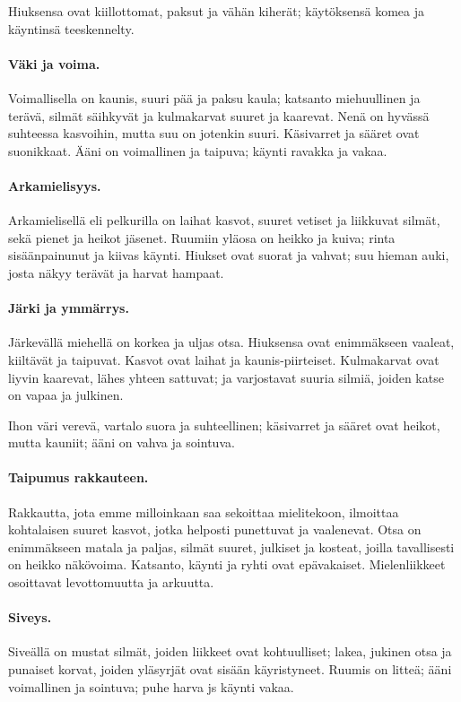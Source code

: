\documentclass[11pt, twoside, finnish, a5paper]{book}
\begin{document}
Hiuksensa ovat kiillottomat, paksut ja vähän kiherät;
käytöksensä komea ja käyntinsä teeskennelty.

\paragraph{Väki ja voima.}
Voimallisella on kaunis, suuri pää ja paksu kaula;
katsanto miehuullinen ja terävä, silmät säihkyvät 
ja kulmakarvat suuret ja kaarevat.
 Nenä on hyvässä suhteessa kasvoihin, mutta suu
on jotenkin suuri. Käsivarret ja sääret ovat
suonikkaat. Ääni on voimallinen ja taipuva;
käynti ravakka ja vakaa.


\paragraph{Arkamielisyys.}
Arkamielisellä eli pelkurilla on laihat kasvot, suuret
vetiset ja liikkuvat silmät, sekä pienet ja heikot jäsenet.
Ruumiin yläosa on heikko ja kuiva; rinta sisäänpainunut
ja kiivas käynti. Hiukset ovat suorat ja vahvat;
suu hieman auki, josta näkyy terävät ja harvat hampaat.
 
\paragraph{Järki ja ymmärrys.}
Järkevällä miehellä on korkea ja uljas otsa.
Hiuksensa ovat enimmäkseen vaaleat, kiiltävät ja taipuvat.
Kasvot ovat laihat ja kaunis-piirteiset. Kulmakarvat
ovat liyvin kaarevat, lähes yhteen sattuvat; ja varjostavat
suuria silmiä, joiden katse on vapaa ja julkinen.

Ihon väri verevä, vartalo suora ja suhteellinen; 
käsivarret ja sääret ovat heikot, mutta kauniit; ääni on vahva
ja sointuva.

\paragraph{Taipumus rakkauteen.}
Rakkautta, jota emme milloinkaan saa sekoittaa mielitekoon,
ilmoittaa kohtalaisen suuret kasvot, jotka helposti
punettuvat ja vaalenevat. Otsa on enimmäkseen matala
ja paljas, silmät suuret, julkiset ja kosteat, joilla
tavallisesti on heikko näkövoima. Katsanto, käynti ja ryhti
ovat epävakaiset. Mielenliikkeet osoittavat levottomuutta 
ja arkuutta.

\paragraph{Siveys.}
Siveällä on mustat silmät, joiden liikkeet ovat
kohtuulliset; lakea, jukinen otsa ja punaiset korvat, joiden
yläsyrjät ovat sisään käyristyneet. Ruumis  on litteä;
ääni voimallinen ja sointuva; puhe harva js käynti vakaa.
\end{document}
